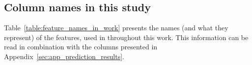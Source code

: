 \documentclass{aa}
\begin{document}
\begin{acknowledgements}
\end{acknowledgements}

%
%




\begin{appendix} %

\section{Column names in this study}\label{sec:app_feature_names}

Table~\ref{table:feature_names_in_work} presents the names (and what they represent) of the features, used in throughout this work. This information can be read in combination with the columns presented in Appendix~\ref{sec:app_prediction_results}.


\end{appendix}
\end{document}
